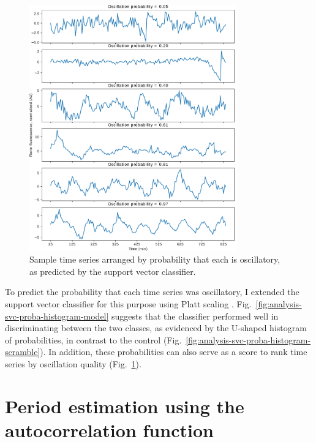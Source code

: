 \begin{figure}
  \centering
  \includegraphics[width=0.8\textwidth]{svm_3_edit.pdf}

  \caption{
    Sample time series arranged by probability that each is oscillatory, as predicted by the support vector classifier.
  }
  \label{fig:analysis-svc-proba-gallery}
\end{figure}

To predict the probability that each time series was oscillatory, I extended the support vector classifier for this purpose using Platt scaling \parencite{plattProbabilisticOutputsSupport1999}.
Fig.\ \ref{fig:analysis-svc-proba-histogram-model} suggests that the classifier performed well in discriminating between the two classes, as evidenced by the U-shaped histogram of probabilities, in contrast to the control (Fig.\ \ref{fig:analysis-svc-proba-histogram-scramble}).
In addition, these probabilities can also serve as a score to rank time series by oscillation quality (Fig.\ \ref{fig:analysis-svc-proba-gallery}).


\section{Period estimation using the autocorrelation function}
\label{sec:analysis-characterisation}

